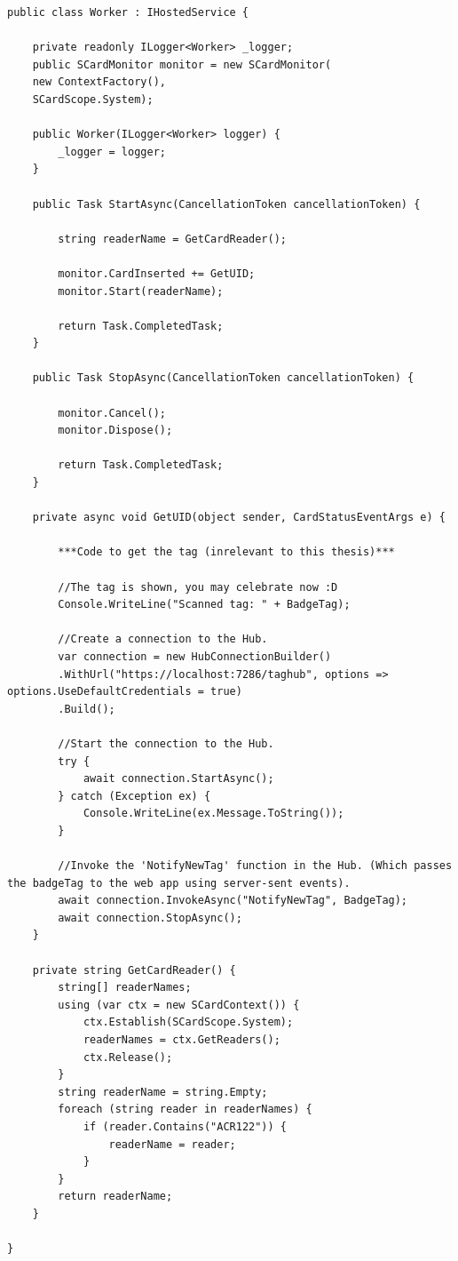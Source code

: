 \begin{verbatim} 
public class Worker : IHostedService {
    
    private readonly ILogger<Worker> _logger;
    public SCardMonitor monitor = new SCardMonitor(
    new ContextFactory(),
    SCardScope.System);
    
    public Worker(ILogger<Worker> logger) {
        _logger = logger;
    }
    
    public Task StartAsync(CancellationToken cancellationToken) {
        
        string readerName = GetCardReader();
        
        monitor.CardInserted += GetUID;    
        monitor.Start(readerName);
    
        return Task.CompletedTask;
    }

    public Task StopAsync(CancellationToken cancellationToken) {
        
        monitor.Cancel();
        monitor.Dispose();
        
        return Task.CompletedTask;
    }
    
    private async void GetUID(object sender, CardStatusEventArgs e) {
        
        ***Code to get the tag (inrelevant to this thesis)***
                            
        //The tag is shown, you may celebrate now :D
        Console.WriteLine("Scanned tag: " + BadgeTag);
        
        //Create a connection to the Hub.
        var connection = new HubConnectionBuilder()
        .WithUrl("https://localhost:7286/taghub", options => options.UseDefaultCredentials = true)
        .Build();
        
        //Start the connection to the Hub.
        try {
            await connection.StartAsync();
        } catch (Exception ex) {
            Console.WriteLine(ex.Message.ToString());
        }
        
        //Invoke the 'NotifyNewTag' function in the Hub. (Which passes the badgeTag to the web app using server-sent events).
        await connection.InvokeAsync("NotifyNewTag", BadgeTag);
        await connection.StopAsync();
    }
    
    private string GetCardReader() {
        string[] readerNames;
        using (var ctx = new SCardContext()) {
            ctx.Establish(SCardScope.System);
            readerNames = ctx.GetReaders();
            ctx.Release();
        }
        string readerName = string.Empty;
        foreach (string reader in readerNames) {
            if (reader.Contains("ACR122")) {
                readerName = reader;
            }
        }
        return readerName;
    }

}
\end{verbatim} 


